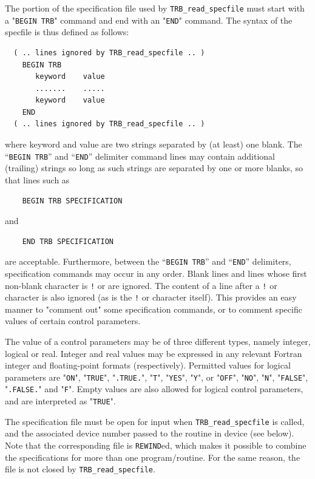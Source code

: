 \documentclass{galahad}
\newcommand{\packagename}{TRB}
\begin{document}
The portion of the specification file used by
{\tt \packagename\_read\_specfile}
must start
with a "{\tt BEGIN \packagename}" command and end with an
"{\tt END}" command.  The syntax of the specfile is thus defined as follows:
\begin{verbatim}
  ( .. lines ignored by TRB_read_specfile .. )
    BEGIN TRB
       keyword    value
       .......    .....
       keyword    value
    END
  ( .. lines ignored by TRB_read_specfile .. )
\end{verbatim}
where keyword and value are two strings separated by (at least) one blank.
The ``{\tt BEGIN \packagename}'' and ``{\tt END}'' delimiter command lines
may contain additional (trailing) strings so long as such strings are
separated by one or more blanks, so that lines such as
\begin{verbatim}
    BEGIN TRB SPECIFICATION
\end{verbatim}
and
\begin{verbatim}
    END TRB SPECIFICATION
\end{verbatim}
are acceptable. Furthermore,
between the
``{\tt BEGIN \packagename}'' and ``{\tt END}'' delimiters,
specification commands may occur in any order.  Blank lines and
lines whose first non-blank character is {\tt !} or {\tt *} are ignored.
The content
of a line after a {\tt !} or {\tt *} character is also
ignored (as is the {\tt !} or {\tt *}
character itself). This provides an easy manner to "comment out" some
specification commands, or to comment specific values
of certain control parameters.

The value of a control parameters may be of three different types, namely
integer, logical or real.
Integer and real values may be expressed in any relevant Fortran integer and
floating-point formats (respectively). Permitted values for logical
parameters are "{\tt ON}", "{\tt TRUE}", "{\tt .TRUE.}", "{\tt T}",
"{\tt YES}", "{\tt Y}", or "{\tt OFF}", "{\tt NO}",
"{\tt N}", "{\tt FALSE}", "{\tt .FALSE.}" and "{\tt F}".
Empty values are also allowed for
logical control parameters, and are interpreted as "{\tt TRUE}".

The specification file must be open for
input when {\tt \packagename\_read\_specfile}
is called, and the associated device number
passed to the routine in device (see below).
Note that the corresponding
file is {\tt REWIND}ed, which makes it possible to combine the specifications
for more than one program/routine.  For the same reason, the file is not
closed by {\tt \packagename\_read\_specfile}.
\end{document}
